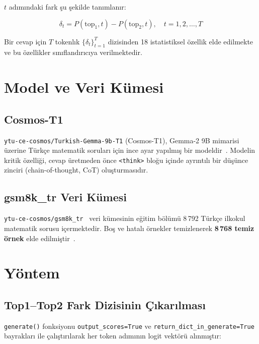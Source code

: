 \documentclass[conference]{IEEEtran}
\begin{document}
$t$ adımındaki fark şu şekilde tanımlanır:

\begin{equation}
  \delta_t = P\!\left(\mathrm{top}_1, t\right) - P\!\left(\mathrm{top}_2, t\right),
  \quad t = 1, 2, \ldots, T
\end{equation}

Bir cevap için $T$ tokenlık $\{\delta_t\}_{t=1}^{T}$ dizisinden 18 istatistiksel
özellik elde edilmekte ve bu özellikler sınıflandırıcıya verilmektedir.

\section{Model ve Veri Kümesi}

\subsection{Cosmos-T1}

\texttt{ytu-ce-cosmos/Turkish-Gemma-9b-T1} (Cosmos-T1), Gemma-2 9B mimarisi
üzerine Türkçe matematik soruları için ince ayar yapılmış bir modeldir~\cite{cosmos}.
Modelin kritik özelliği, cevap üretmeden önce \texttt{<think>} bloğu içinde
ayrıntılı bir düşünce zinciri (chain-of-thought, CoT) oluşturmasıdır.

\subsection{gsm8k\_tr Veri Kümesi}

\texttt{ytu-ce-cosmos/gsm8k\_tr}~\cite{gsm8k_tr} veri kümesinin eğitim bölümü
8\,792 Türkçe ilkokul matematik sorusu içermektedir. Boş ve hatalı örnekler
temizlenerek \textbf{8\,768 temiz örnek} elde edilmiştir~\cite{cobbe2021gsm8k}.

\section{Yöntem}

\subsection{Top1--Top2 Fark Dizisinin Çıkarılması}

\texttt{generate()} fonksiyonu \texttt{output\_scores=True} ve
\texttt{return\_dict\_in\_generate=True} bayrakları ile çalıştırılarak
her token adımının logit vektörü alınmıştır:
\end{document}
